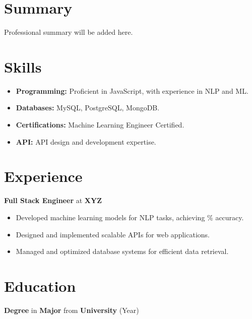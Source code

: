 \documentclass{resume}
\begin{document}
\maketitle

\section{Summary}
Professional summary will be added here.

\section{Skills}
\begin{itemize}[leftmargin=*, noitemsep]
    \item \textbf{Programming:} Proficient in JavaScript, with experience in NLP and ML.
    \item \textbf{Databases:} MySQL, PostgreSQL, MongoDB.
    \item \textbf{Certifications:} Machine Learning Engineer Certified.
    \item \textbf{API:} API design and development expertise.
\end{itemize}

\section{Experience}
\textbf{Full Stack Engineer} at \textbf{XYZ}
\begin{itemize}[leftmargin=*, noitemsep]
    \item Developed machine learning models for NLP tasks, achieving \% accuracy.
    \item Designed and implemented scalable APIs for web applications.
    \item Managed and optimized database systems for efficient data retrieval.
\end{itemize}

\section{Education}
\textbf{Degree} in \textbf{Major} from \textbf{University} (Year)
\end{document}
